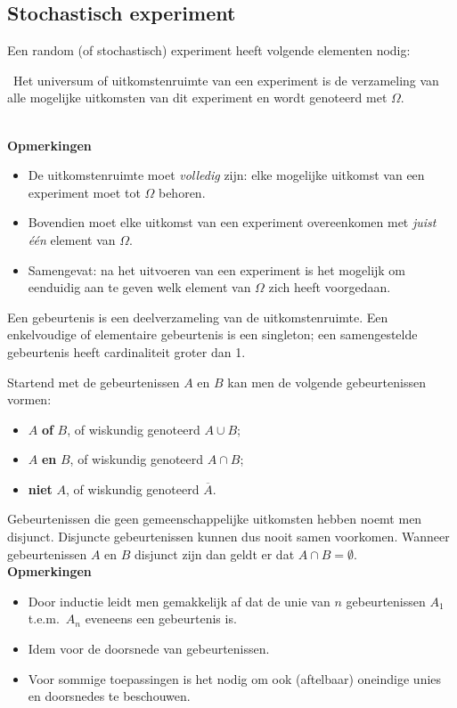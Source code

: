 \subsection{Stochastisch experiment}
Een random (of stochastisch) experiment heeft volgende elementen nodig:

\begin{definition}\
 Het universum of uitkomstenruimte van een experiment
is de verzameling van alle mogelijke uitkomsten van dit experiment en
wordt genoteerd met $\Omega$.
\end{definition}
~\\
\textbf{Opmerkingen}
\begin{itemize}
\item De uitkomstenruimte moet \emph{volledig}\/ zijn: elke mogelijke
uitkomst van een experiment moet tot $\Omega$ behoren.
\item Bovendien moet elke
uitkomst van een experiment overeenkomen met \emph{juist \'e\'en}\/ element van
$\Omega$.
\item Samengevat: na het uitvoeren van een experiment is het  mogelijk  om eenduidig
aan te geven welk element van $\Omega$ zich heeft voorgedaan.
\end{itemize}

\begin{definition}[Gebeurtenis]
 Een gebeurtenis is een deelverzameling van de uitkomstenruimte. Een enkelvoudige of elementaire gebeurtenis is een singleton;   een samengestelde gebeurtenis heeft cardinaliteit groter dan 1.
\end{definition}

Startend met de gebeurtenissen $A$ en $B$ kan men de volgende gebeurtenissen vormen:
 \begin{itemize}
  \item $A$ \textbf{of} $B$, of wiskundig genoteerd $A \cup B$;
  \item $A$ \textbf{en} $B$, of wiskundig genoteerd $A \cap B$;
  \item \textbf{niet} $A$, of wiskundig genoteerd $\overline{A}$.
\end{itemize}

Gebeurtenissen die geen gemeenschappelijke uitkomsten hebben noemt men disjunct.
Disjuncte gebeurtenissen kunnen dus nooit samen voorkomen.
Wanneer gebeurtenissen $A$ en $B$ disjunct zijn dan geldt er dat $A \cap B = \emptyset$.
~\\
\textbf{Opmerkingen}
\begin{itemize}
\item Door inductie leidt men gemakkelijk  af dat
de unie van $n$  gebeurtenissen $A_1$ t.e.m.~$A_n$ eveneens
een gebeurtenis is.
\item Idem voor de doorsnede van
gebeurtenissen.
\item Voor sommige toepassingen is het nodig om ook (aftelbaar) oneindige
unies en doorsnedes te beschouwen.
\end{itemize}

